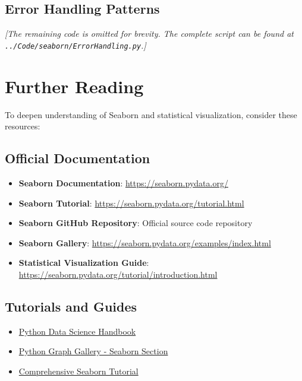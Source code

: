\subsection{Error Handling Patterns}
\label{subsec:error_patterns}



\noindent\textit{[The remaining code is omitted for brevity. The complete script can be found at \texttt{../Code/seaborn/ErrorHandling.py}.]}

\section{Further Reading}
\label{sec:further_reading}

To deepen understanding of Seaborn and statistical visualization, consider these resources:

\subsection{Official Documentation}
\begin{itemize}
	\item \textbf{Seaborn Documentation}: \url{https://seaborn.pydata.org/}
	\item \textbf{Seaborn Tutorial}: \url{https://seaborn.pydata.org/tutorial.html}
	\item \textbf{Seaborn GitHub Repository}: Official source code repository \cite{Seaborn:2024}
	\item \textbf{Seaborn Gallery}: \url{https://seaborn.pydata.org/examples/index.html}
	\item \textbf{Statistical Visualization Guide}: \url{https://seaborn.pydata.org/tutorial/introduction.html}
\end{itemize}

\subsection{Tutorials and Guides}
\begin{itemize}
	\item \href{https://jakevdp.github.io/PythonDataScienceHandbook/}{Python Data Science Handbook} \cite{VanderPlas:2023}
	\item \href{https://www.python-graph-gallery.com/seaborn/}{Python Graph Gallery - Seaborn Section}
	\item \href{https://towardsdatascience.com/data-visualisation-tutorial-using-seaborn-26e1ef9043db/}{Comprehensive Seaborn Tutorial} \cite{TowardsSeaborn:2023}
\end{itemize}

